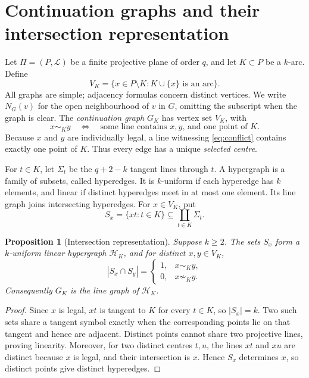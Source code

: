 \documentclass[11pt]{article}
\newtheorem{proposition}[theorem]{Proposition}
\theoremstyle{definition}
\theoremstyle{remark}
\newcommand{\cH}{\mathcal H}
\begin{document}
\section{Continuation graphs and their intersection representation}
\label{sec:def}

Let $\Pi=(P,\mathcal L)$ be a finite projective plane of order $q$, and let
$K\subset P$ be a $k$-arc.  Define
\[
  V_K=\{x\in P\setminus K:K\cup\{x\}\text{ is an arc}\}.
\]
All graphs are simple; adjacency formulas concern distinct vertices.
We write $N_G(v)$ for the open neighbourhood of $v$ in $G$, omitting the
subscript when the graph is clear.
The \emph{continuation graph} $G_K$ has vertex set $V_K$, with
\begin{equation}
  x\sim_K y
  \quad\Longleftrightarrow\quad
  \text{some line contains $x,y$, and one point of $K$}.
  \label{eq:conflict}
\end{equation}
Because $x$ and $y$ are individually legal, a line witnessing \eqref{eq:conflict}
contains exactly one point of $K$.  Thus every edge has a unique
\emph{selected centre}.

For $t\in K$, let $\Sigma_t$ be the $q+2-k$ tangent lines through $t$.
A hypergraph is a family of subsets, called hyperedges. It is $k$-uniform
if each hyperedge has $k$ elements, and linear if distinct hyperedges
meet in at most one element. Its line graph joins intersecting hyperedges.
For $x\in V_K$, put
\[
  S_x=\{xt:t\in K\}\subseteq\coprod_{t\in K}\Sigma_t.
\]

\begin{proposition}[Intersection representation]\label{prop:intersection}
Suppose $k\ge2$. The sets $S_x$ form a $k$-uniform linear hypergraph
$\cH_K$, and for distinct $x,y\in V_K$,
\[
 |S_x\cap S_y|=
 \begin{cases}
 1,&x\sim_Ky,\\
 0,&x\not\sim_Ky.
 \end{cases}
\]
Consequently $G_K$ is the line graph of $\cH_K$.
\end{proposition}

\begin{proof}
Since $x$ is legal, $xt$ is tangent to $K$ for every $t\in K$, so
$|S_x|=k$.  Two such sets share a tangent symbol exactly when the
corresponding points lie on that tangent and hence are adjacent.  Distinct
points cannot share two projective lines, proving linearity. Moreover,
for two distinct centres $t,u$, the lines $xt$ and $xu$ are distinct
because $x$ is legal, and their intersection is $x$. Hence $S_x$ determines
$x$, so distinct points give distinct hyperedges.
\end{proof}
\end{document}
